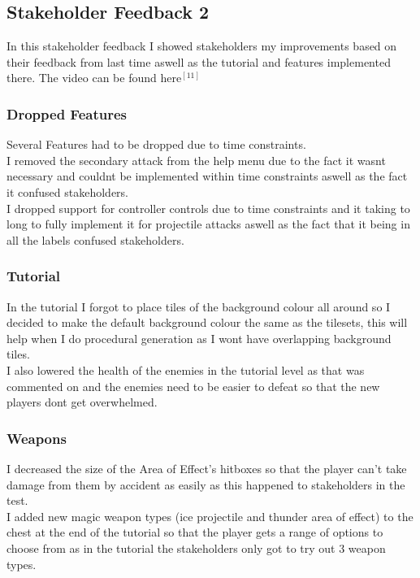 \documentclass{article}
\begin{document}
        \subsection{Stakeholder Feedback 2}
        In this stakeholder feedback I showed stakeholders my improvements based on their feedback from last time aswell as the tutorial and features implemented there. The video can be found here$^{[11]}$\\
        \subsubsection{Dropped Features}
        Several Features had to be dropped due to time constraints.\\
        I removed the secondary attack from the help menu due to the fact it wasnt necessary and couldnt be implemented within time constraints aswell as the fact it confused stakeholders.\\
        I dropped support for controller controls due to time constraints and it taking to long to fully implement it for projectile attacks aswell as the fact that it being in all the labels confused stakeholders.\\
        \subsubsection{Tutorial}
        In the tutorial I forgot to place tiles of the background colour all around so I decided to make the default background colour the same as the tilesets, this will help when I do procedural generation as I wont have overlapping background tiles.\\
        I also lowered the health of the enemies in the tutorial level as that was commented on and the enemies need to be easier to defeat so that the new players dont get overwhelmed.\\
        \subsubsection{Weapons}
        I decreased the size of the Area of Effect's hitboxes so that the player can't take damage from them by accident as easily as this happened to stakeholders in the test.\\
        I added new magic weapon types (ice projectile and thunder area of effect) to the chest at the end of the tutorial so that the player gets a range of options to choose from as in the tutorial the stakeholders only got to try out 3 weapon types.\\
\end{document}
